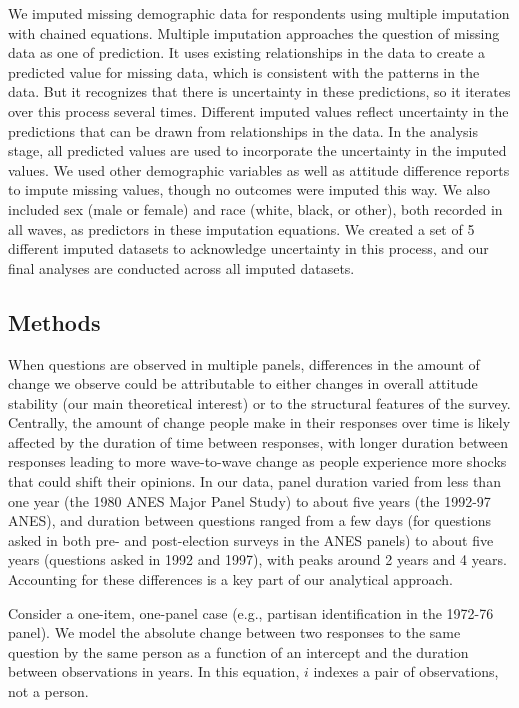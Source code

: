 \documentclass[
  12pt,
]{article}
\begin{document}
We imputed missing demographic data for respondents using multiple imputation with chained equations. Multiple imputation approaches the question of missing data as one of prediction. It uses existing relationships in the data to create a predicted value for missing data, which is consistent with the patterns in the data. But it recognizes that there is uncertainty in these predictions, so it iterates over this process several times. Different imputed values reflect uncertainty in the predictions that can be drawn from relationships in the data. In the analysis stage, all predicted values are used to incorporate the uncertainty in the imputed values. We used other demographic variables as well as attitude difference reports to impute missing values, though no outcomes were imputed this way. We also included sex (male or female) and race (white, black, or other), both recorded in all waves, as predictors in these imputation equations. We created a set of 5 different imputed datasets to acknowledge uncertainty in this process, and our final analyses are conducted across all imputed datasets.

\hypertarget{methods}{%
\subsection{Methods}\label{methods}}

When questions are observed in multiple panels, differences in the amount of change we observe could be attributable to either changes in overall attitude stability (our main theoretical interest) or to the structural features of the survey. Centrally, the amount of change people make in their responses over time is likely affected by the duration of time between responses, with longer duration between responses leading to more wave-to-wave change as people experience more shocks that could shift their opinions. In our data, panel duration varied from less than one year (the 1980 ANES Major Panel Study) to about five years (the 1992-97 ANES), and duration between questions ranged from a few days (for questions asked in both pre- and post-election surveys in the ANES panels) to about five years (questions asked in 1992 and 1997), with peaks around 2 years and 4 years. Accounting for these differences is a key part of our analytical approach.

Consider a one-item, one-panel case (e.g., partisan identification in the 1972-76 panel). We model the absolute change between two responses to the same question by the same person as a function of an intercept and the duration between observations in years. In this equation, \(i\) indexes a pair of observations, not a person.
\end{document}
